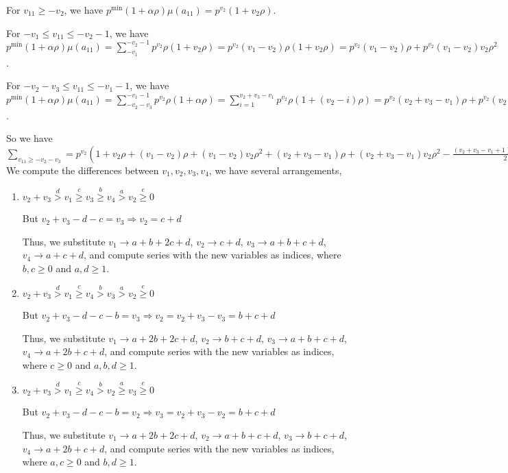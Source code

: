 \documentclass{article}
\begin{document}
For $v_{11}\geq{-v_2}$, we have $p^{\min}(1+\alpha\rho)\mu(a_{11})=p^{v_2}(1+v_2\rho)$.

For $-v_1\leq{v_{11}}\leq{-v_2-1}$, we have $p^{\min}(1+\alpha\rho)\mu(a_{11})=\sum_{-v_1}^{-v_2-1}p^{v_2}\rho(1+v_2\rho)=p^{v_2}(v_1-v_2)\rho(1+v_2\rho)=p^{v_2}(v_1-v_2)\rho+p^{v_2}(v_1-v_2)v_2\rho^2$.

For $-v_2-v_3\leq{v_{11}}\leq{-v_1-1}$, we have $p^{\min}(1+\alpha\rho)\mu(a_{11})=\sum_{-v_2-v_3}^{-v_1-1}p^{v_2}\rho(1+\alpha\rho)=\sum_{i=1}^{v_2+v_3-v_1}p^{v_2}\rho(1+(v_2-i)\rho)=p^{v_2}(v_2+v_3-v_1)\rho+p^{v_2}(v_2+v_3-v_1)v_2\rho^2-p^{v_2}\binom{v_2+v_3-v_1+1}{2}\rho^2$.

So we have $\sum_{v_{11}\geq{-v_2-v_3}}=p^{v_2}(1+v_2\rho+(v_1-v_2)\rho+(v_1-v_2)v_2\rho^2+(v_2+v_3-v_1)\rho+(v_2+v_3-v_1)v_2\rho^2-\frac{(v_2+v_3-v_1+1)(v_2+v_3-v_1)}{2}\rho^2).$
We compute the differences between $v_1,v_2,v_3,v_4$, we have several arrangements,
\begin{enumerate}
    \item 
$v_2+v_3\overset{d}{>}v_1\overset{c}{\geq}v_3\overset{b}{\geq}{v_4}\overset{a}>v_2\overset{e}{\geq}{0}$

But $v_2+v_3-d-c=v_3\Rightarrow{v_2=c+d}$

Thus, we substitute 
$v_1\rightarrow{a+b+2c+d}$, 
$v_2\rightarrow{c+d}$, 
$v_3\rightarrow{a+b+c+d}$, 
$v_4\rightarrow{a+c+d}$, and compute series with the new variables as indices, where $b,c\geq{0}$ and $a,d\geq{1}$.

\item 
$v_2+v_3\overset{d}{>}v_1\overset{c}{\geq}v_4\overset{b}{>}{v_3}\overset{a}>v_2\overset{e}{\geq}{0}$

But $v_2+v_3-d-c-b=v_3\Rightarrow{v_2=v_2+v_3-v_3=b+c+d}$

Thus, we substitute 
$v_1\rightarrow{a+2b+2c+d}$, 
$v_2\rightarrow{b+c+d}$, 
$v_3\rightarrow{a+b+c+d}$, 
$v_4\rightarrow{a+2b+c+d}$, and compute series with the new variables as indices, where $c\geq{0}$ and $a,b,d\geq{1}$.

\item 
$v_2+v_3\overset{d}{>}v_1\overset{c}{\geq}v_4\overset{b}{>}{v_2}\overset{a}{\geq}v_3\overset{e}{\geq}{0}$

But $v_2+v_3-d-c-b=v_2\Rightarrow{v_3=v_2+v_3-v_2=b+c+d}$

Thus, we substitute 
$v_1\rightarrow{a+2b+2c+d}$, 
$v_2\rightarrow{a+b+c+d}$, 
$v_3\rightarrow{b+c+d}$, 
$v_4\rightarrow{a+2b+c+d}$, and compute series with the new variables as indices, where $a,c\geq{0}$ and $b,d\geq{1}$.

\end{enumerate}
\end{document}
